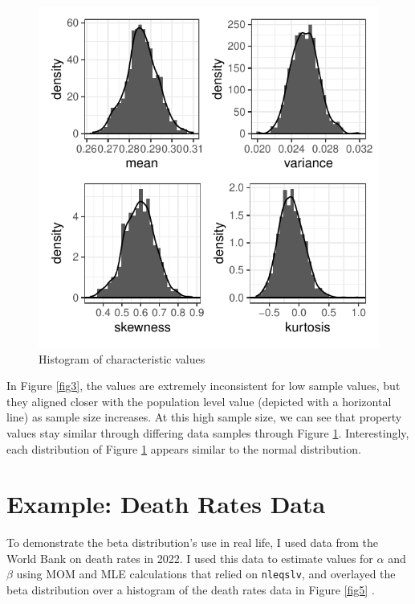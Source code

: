 \documentclass{article}\usepackage[]{graphicx}\usepackage[]{xcolor}
\begin{document}
\begin{multicols}{2}
\begin{figure}[H]
 \begin{center}
 \includegraphics[scale=0.7]{sampling_distrib.pdf}
 \caption{Histogram of characteristic values}
 \label{fig4}
 \end{center}
 \end{figure}

In Figure \ref{fig3}, the values are extremely inconsistent for low sample values, but they aligned closer with the population level value (depicted with a horizontal line) as sample size increases. At this high sample size, we can see that property values stay similar through differing data samples through Figure \ref{fig4}. Interestingly, each distribution of Figure \ref{fig4} appears similar to the normal distribution.


\section{Example: Death Rates Data}
To demonstrate the beta distribution's use in real life, I used data from the World Bank on death rates in 2022. I used this data to estimate values for $\alpha$ and $\beta$ using MOM and MLE calculations that relied on \texttt{nleqslv}, and overlayed the beta distribution over a histogram of the death rates data in Figure \ref{fig5} \citep{nleqslv}.


\end{multicols}
\end{document}
